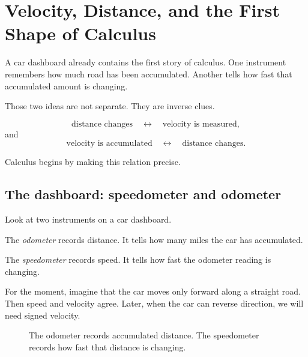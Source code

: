 
\chapter{Velocity, Distance, and the First Shape of Calculus}
\label{chap:velocity-distance}

A car dashboard already contains the first story of calculus. One instrument remembers how much road has been accumulated. Another tells how fast that accumulated amount is changing.

Those two ideas are not separate. They are inverse clues.

\[
\text{distance changes} \quad \longleftrightarrow \quad \text{velocity is measured},
\]
and
\[
\text{velocity is accumulated} \quad \longleftrightarrow \quad \text{distance changes}.
\]

Calculus begins by making this relation precise.

\section{The dashboard: speedometer and odometer}
\label{sec:dashboard}

Look at two instruments on a car dashboard.

The \emph{odometer} records distance. It tells how many miles the car has accumulated.

The \emph{speedometer} records speed. It tells how fast the odometer reading is changing.

For the moment, imagine that the car moves only forward along a straight road. Then speed and velocity agree. Later, when the car can reverse direction, we will need signed velocity.

\begin{figure}[h]
\centering
{}
\caption{The odometer records accumulated distance. The speedometer records how fast that distance is changing.}
\label{fig:dashboard}
\end{figure}

